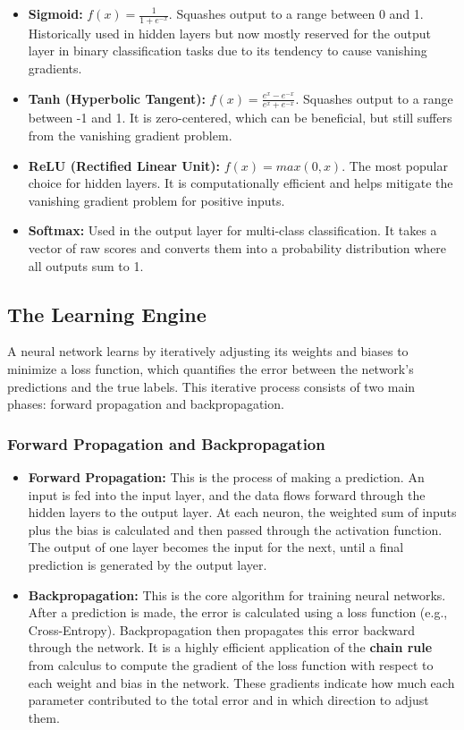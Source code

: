 \documentclass[11pt,a4paper]{article}
\begin{document}
\begin{itemize}
    \item \textbf{Sigmoid:} $f(x) = \frac{1}{1+e^{-x}}$. Squashes output to a range between 0 and 1. Historically used in hidden layers but now mostly reserved for the output layer in binary classification tasks due to its tendency to cause vanishing gradients.
    \item \textbf{Tanh (Hyperbolic Tangent):} $f(x) = \frac{e^{x}-e^{-x}}{e^{x}+e^{-x}}$. Squashes output to a range between -1 and 1. It is zero-centered, which can be beneficial, but still suffers from the vanishing gradient problem.
    \item \textbf{ReLU (Rectified Linear Unit):} $f(x) = max(0, x)$. The most popular choice for hidden layers. It is computationally efficient and helps mitigate the vanishing gradient problem for positive inputs.
    \item \textbf{Softmax:} Used in the output layer for multi-class classification. It takes a vector of raw scores and converts them into a probability distribution where all outputs sum to 1.
\end{itemize}

\subsection{The Learning Engine}

A neural network learns by iteratively adjusting its weights and biases to minimize a loss function, which quantifies the error between the network's predictions and the true labels. This iterative process consists of two main phases: forward propagation and backpropagation.

\subsubsection{Forward Propagation and Backpropagation}

\begin{itemize}
    \item \textbf{Forward Propagation:} This is the process of making a prediction. An input is fed into the input layer, and the data flows forward through the hidden layers to the output layer. At each neuron, the weighted sum of inputs plus the bias is calculated and then passed through the activation function. The output of one layer becomes the input for the next, until a final prediction is generated by the output layer.
    \item \textbf{Backpropagation:} This is the core algorithm for training neural networks. After a prediction is made, the error is calculated using a loss function (e.g., Cross-Entropy). Backpropagation then propagates this error backward through the network. It is a highly efficient application of the \textbf{chain rule} from calculus to compute the gradient of the loss function with respect to each weight and bias in the network. These gradients indicate how much each parameter contributed to the total error and in which direction to adjust them.
\end{itemize}
\end{document}
